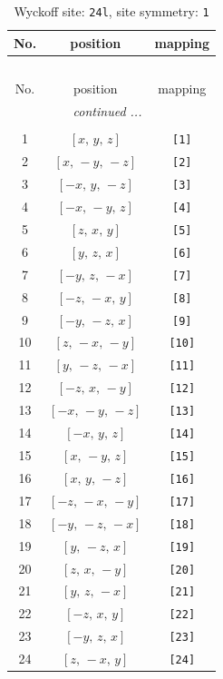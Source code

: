 \documentclass[fleqn,8pt]{jsarticle}
\begin{document}
\begin{longtable}{ccc}
\caption{Wyckoff site: {\tt 24l}, site symmetry: {\tt 1}}
 \\
 \hline \hline
No. & position & mapping \\ \hline \endfirsthead

\multicolumn{2}{l}{\tablename\ \thetable{}} \\
 \hline \hline
No. & position & mapping \\ \hline \endhead

 \hline \hline
\multicolumn{2}{r}{\footnotesize\it continued ...} \\ \endfoot

 \hline \hline
\multicolumn{2}{r}{} \\ \endlastfoot

1 & $\left[ x,\, y,\, z \right]$ & {\tt [1]} \\ \hline
2 & $\left[ x,\, - y,\, - z \right]$ & {\tt [2]} \\ \hline
3 & $\left[ - x,\, y,\, - z \right]$ & {\tt [3]} \\ \hline
4 & $\left[ - x,\, - y,\, z \right]$ & {\tt [4]} \\ \hline
5 & $\left[ z,\, x,\, y \right]$ & {\tt [5]} \\ \hline
6 & $\left[ y,\, z,\, x \right]$ & {\tt [6]} \\ \hline
7 & $\left[ - y,\, z,\, - x \right]$ & {\tt [7]} \\ \hline
8 & $\left[ - z,\, - x,\, y \right]$ & {\tt [8]} \\ \hline
9 & $\left[ - y,\, - z,\, x \right]$ & {\tt [9]} \\ \hline
10 & $\left[ z,\, - x,\, - y \right]$ & {\tt [10]} \\ \hline
11 & $\left[ y,\, - z,\, - x \right]$ & {\tt [11]} \\ \hline
12 & $\left[ - z,\, x,\, - y \right]$ & {\tt [12]} \\ \hline
13 & $\left[ - x,\, - y,\, - z \right]$ & {\tt [13]} \\ \hline
14 & $\left[ - x,\, y,\, z \right]$ & {\tt [14]} \\ \hline
15 & $\left[ x,\, - y,\, z \right]$ & {\tt [15]} \\ \hline
16 & $\left[ x,\, y,\, - z \right]$ & {\tt [16]} \\ \hline
17 & $\left[ - z,\, - x,\, - y \right]$ & {\tt [17]} \\ \hline
18 & $\left[ - y,\, - z,\, - x \right]$ & {\tt [18]} \\ \hline
19 & $\left[ y,\, - z,\, x \right]$ & {\tt [19]} \\ \hline
20 & $\left[ z,\, x,\, - y \right]$ & {\tt [20]} \\ \hline
21 & $\left[ y,\, z,\, - x \right]$ & {\tt [21]} \\ \hline
22 & $\left[ - z,\, x,\, y \right]$ & {\tt [22]} \\ \hline
23 & $\left[ - y,\, z,\, x \right]$ & {\tt [23]} \\ \hline
24 & $\left[ z,\, - x,\, y \right]$ & {\tt [24]} \\
\end{longtable}
\end{document}
